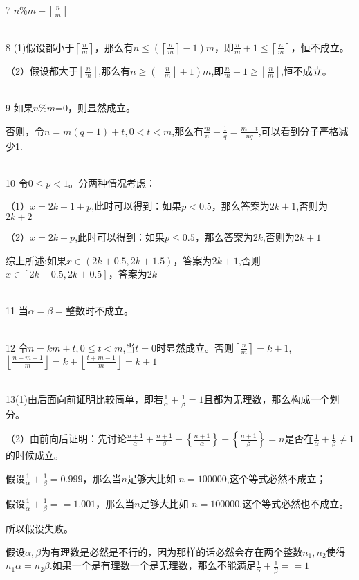 \documentclass[onecolumn]{article}
\begin{document}
7 $n$\%$m+\left \lfloor \frac{n}{m} \right \rfloor$ \par
~\\
8 (1)假设都小于$\left \lceil \frac{n}{m} \right \rceil$，那么有$n\leq (\left \lceil \frac{n}{m} \right \rceil-1)m$，即$\frac{n}{m}+1\leq \left \lceil \frac{n}{m} \right \rceil$，恒不成立。\par
（2）假设都大于$\left \lfloor \frac{n}{m} \right \rfloor$,那么有$n\geq (\left \lfloor \frac{n}{m} \right \rfloor+1)m$,即$\frac{n}{m}-1\geq \left \lfloor \frac{n}{m} \right \rfloor$,恒不成立。\par
~\\
9 如果$n$\%$m$=0，则显然成立。 \par
否则，令$n=m(q-1)+t,0<t<m$,那么有$\frac{m}{n}-\frac{1}{q}=\frac{m-t}{nq}$,可以看到分子严格减少1. \par
~\\
10 令$0\leq p<1$。分两种情况考虑：\par
（1）$x=2k+1+p$,此时可以得到：如果$p<0.5$，那么答案为$2k+1$,否则为$2k+2$ \par
（2）$x=2k+p$,此时可以得到：如果$p\leq0.5$，那么答案为$2k$,否则为$2k+1$ \par
综上所述:如果$x\in(2k+0.5,2k+1.5)$，答案为$2k+1$,否则$x\in[2k-0.5,2k+0.5]$，答案为$2k$ \par
~\\
11 当$\alpha=\beta=$整数时不成立。\par
~\\
12 令$n=km+t,0\leq t<m$,当$t=0$时显然成立。否则$\left \lceil \frac{n}{m} \right \rceil=k+1$,$\left \lfloor \frac{n+m-1}{m} \right \rfloor=k+\left \lfloor \frac{t+m-1}{m} \right \rfloor=k+1$ \par
~\\
13(1)由后面向前证明比较简单，即若$\frac{1}{\alpha}+\frac{1}{\beta}=1$且都为无理数，那么构成一个划分。\par
（2）由前向后证明：先讨论$\frac{n+1}{\alpha}+\frac{n+1}{\beta}-\left \{ \frac{n+1}{\alpha} \right \}-\left \{ \frac{n+1}{\beta} \right \}=n$是否在$\frac{1}{\alpha}+\frac{1}{\beta}\neq1$的时候成立。\par
假设$\frac{1}{\alpha}+\frac{1}{\beta}=0.999$，那么当$n$足够大比如 $n=100000$,这个等式必然不成立； \par
假设$\frac{1}{\alpha}+\frac{1}{\beta}==1.001$，那么当$n$足够大比如 $n=100000$,这个等式必然也不成立。\par
所以假设失败。\par
假设$\alpha,\beta$为有理数是必然是不行的，因为那样的话必然会存在两个整数$n_{1},n_{2}$使得$n_{1}\alpha=n_{2}\beta$.如果一个是有理数一个是无理数，那么不能满足$\frac{1}{\alpha}+\frac{1}{\beta}==1$\par
\end{document}
